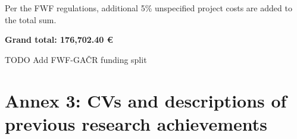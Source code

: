 \documentclass[a4paper,11pt]{scrartcl}
\begin{document}
Per the FWF regulations, additional 5\% unspecified project costs are added to the total sum.
\begin{center}
    \textbf{Grand total: 176,702.40 €}
\end{center}

TODO Add FWF-GAČR funding split
\newpage
\section*{Annex 3: CVs and descriptions of previous research achievements}


\newpage


\newpage


\end{document}
